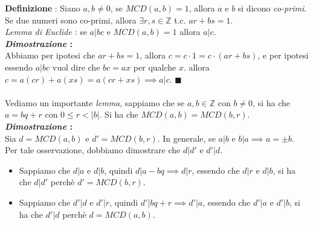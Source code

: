 \documentclass[12pt, letterpaper]{article}
\begin{document}
\textbf{Definizione }: Siano \(a,b\ne 0\), se \(MCD(a,b)=1\), allora \(a\) e \(b\) si dicono \textit{co-primi}. Se 
due numeri sono co-primi, allora \(\exists r,s \in \mathbb{Z}\) t.c. \(ar+bs=1\).\\
\textit{Lemma di Euclide} : se \(a|bc\) e \(MCD(a,b)=1\) allora \(a|c\). \\
\textbf{\textit{Dimostrazione }:}\\
Abbiamo per ipotesi che \(ar+bs=1\), allora \(c=c\cdot 1 = c\cdot (ar+bs)\), e per ipotesi essendo \(a|bc\) vuol dire 
che \(bc = ax\) per qualche \(x\). allora \(c=a(cr)+a(xs)=a(cr+xs)\implies a|c\). \(\blacksquare\) 
\\\hphantom{.}\\Vediamo un importante \textit{lemma}, sappiamo che se \(a,b\in\mathbb{Z}\) con \(b\ne 0\), si ha che 
\(a=bq+r\) con \(0\le r<|b|\). Si ha che \(MCD(a,b)=MCD(b,r)\).\\\textbf{\textit{Dimostrazione }:}\\
Sia \(d=MCD(a,b)\) e \(d'=MCD(b,r)\). In generale, se \(a|b\) e \(b|a\implies a=\pm b\). Per tale osservazione, 
dobbiamo dimostrare che \(d|d'\) e \(d'|d\).
\begin{itemize}
    \item Sappiamo che \(d|a\) e \(d|b\), quindi \(d|a-bq\implies d|r\), essendo che \(d|r\) e  \(d|b\), si ha 
    che \(d|d'\) perchè \(d'=MCD(b,r)\). 
    \item Sappiamo che \(d'|d\) e \(d'|r\), quindi \(d'|bq+r\implies d'|a\), essendo che \(d'|a\) e  \(d'|b\), si ha 
    che \(d'|d\) perchè \(d=MCD(a,b)\). 
\end{itemize}
\raggedleft{\(\blacksquare\)}

\raggedright
\end{document}
